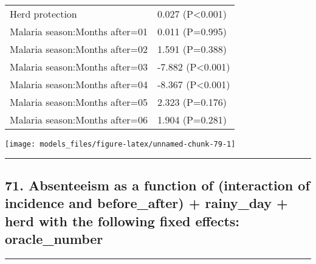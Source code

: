 \documentclass[]{article}
\begin{document}
\begin{longtable}[t]{ll}
\hspace{1em}Herd protection & 0.027 (P<0.001)\\
\hspace{1em}Malaria season:Months after=01 & 0.011 (P=0.995)\\
\hspace{1em}Malaria season:Months after=02 & 1.591 (P=0.388)\\
\hspace{1em}Malaria season:Months after=03 & -7.882 (P<0.001)\\
\hspace{1em}Malaria season:Months after=04 & -8.367 (P<0.001)\\
\hspace{1em}Malaria season:Months after=05 & 2.323 (P=0.176)\\
\hspace{1em}Malaria season:Months after=06 & 1.904 (P=0.281)\\*
\end{longtable}

\begin{center}\texttt{[image: models\_files/figure-latex/unnamed-chunk-79-1]} \end{center}

\newpage

\begin{center}\rule{0.5\linewidth}{\linethickness}\end{center}

\subsection{71. Absenteeism as a function of (interaction of incidence
and before\_after) + rainy\_day + herd with the following fixed effects:
oracle\_number}\label{absenteeism-as-a-function-of-interaction-of-incidence-and-before_after-rainy_day-herd-with-the-following-fixed-effects-oracle_number-1}

\begin{center}\rule{0.5\linewidth}{\linethickness}\end{center}
\end{document}
